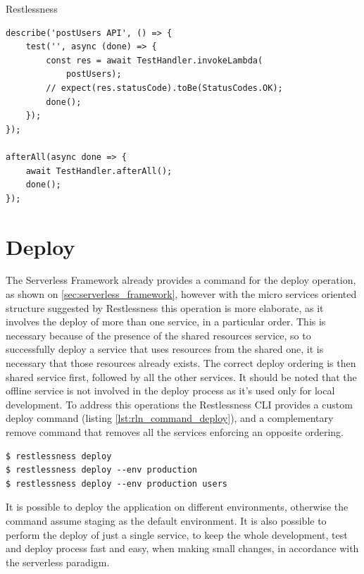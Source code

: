\begin{chapter}{Restlessness}
\begin{lstlisting}[caption=index.test.ts template, label={lst:endopints_test_ts}]
describe('postUsers API', () => {
    test('', async (done) => {
        const res = await TestHandler.invokeLambda(
            postUsers);
        // expect(res.statusCode).toBe(StatusCodes.OK);
        done();
    });
});

afterAll(async done => {
    await TestHandler.afterAll();
    done();
});
    \end{lstlisting}


    \section{Deploy}
    The Serverless Framework already provides a command for the deploy operation,
    as shown on \ref{sec:serverless_framework}, however with the micro services oriented
    structure suggested by Restlessness this operation is more elaborate, as it
    involves the deploy of more than one service, in a particular order.
    This is necessary because of the presence of the shared resources service, so
    to successfully deploy a service that uses resources from the shared one, it
    is necessary that those resources already exists. The correct deploy ordering
    is then shared service first, followed by all the other services.
    It should be noted that the offline service is not involved in the deploy
    process as it's used only for local development.
    To address this operations the Restlessness CLI provides a custom deploy
    command (listing \ref{lst:rln_command_deploy}), and a complementary remove command
    that removes all the services enforcing an opposite ordering.

    \begin{lstlisting}[caption=Deploy command, label={lst:rln_command_deploy}]
$ restlessness deploy
$ restlessness deploy --env production
$ restlessness deploy --env production users
    \end{lstlisting}

    It is possible to deploy the application on different environments, otherwise
    the command assume staging as the default environment.
    It is also possible to perform the deploy of just a single service, to keep
    the whole development, test and deploy process fast and easy, when making small
    changes, in accordance with the serverless paradigm.


\end{chapter}
